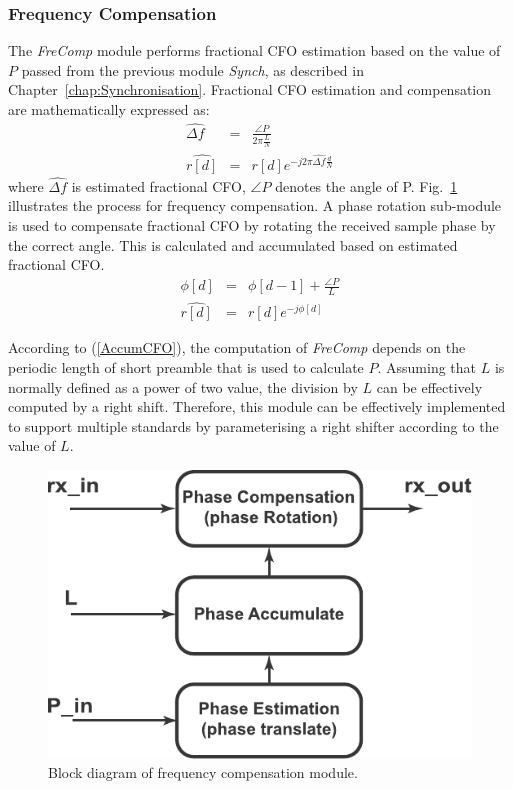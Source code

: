\subsubsection{Frequency Compensation}
The \emph{FreComp} module performs fractional CFO estimation based on the value of $P$ passed from the previous module \emph{Synch}, as described in Chapter~\ref{chap:Synchronisation}.
Fractional CFO estimation and compensation are mathematically expressed as:
\begin{eqnarray}
\label{fractionalCFO}
\widehat{\Delta f } &=& \frac{\angle P}{2\pi \frac{L}{N}} \nonumber \\
\widehat{r[d]} &=& r[d] e^{-j2\pi\widehat{\Delta f} \frac{d}{N}}
\end{eqnarray}
where $\widehat{\Delta f }$ is estimated fractional CFO, $\angle P$ denotes the angle of P.
Fig.~\ref{fig:FFO} illustrates the process for frequency compensation.
A phase rotation sub-module is used to compensate fractional CFO by rotating the received sample phase by the correct angle.
This is calculated and accumulated based on estimated fractional CFO.
\begin{eqnarray}
\label{AccumCFO}
\phi[d] &=& \phi[d-1] + \frac{\angle P}{L} \nonumber \\
\widehat{r[d]} &=& r[d] e^{-j \phi[d]}
\end{eqnarray}

According to (\ref{AccumCFO}), the computation of \emph{FreComp} depends on the periodic length of short preamble that is used to calculate $P$.
Assuming that $L$ is normally defined as a power of two value, the division by $L$ can be effectively computed by a right shift.
Therefore, this module can be effectively implemented to support multiple standards by parameterising a right shifter according to the value of $L$.
\begin{figure}
\centering
\includegraphics [width=0.4\columnwidth]{Figures/MSCR_RX_FFO.pdf}
\caption{Block diagram of frequency compensation module.}
\label{fig:FFO}
\end{figure}

